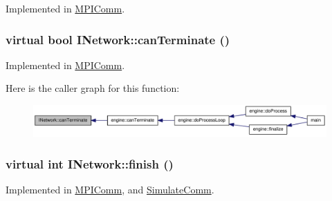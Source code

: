 Implemented in \hyperlink{class_m_p_i_comm_a42d5d0b9d3a804931b2a58c468e08d0d}{MPIComm}.\hypertarget{class_i_network_a49a4daa697317d6fc065897a7926c26c}{
\subsubsection[{canTerminate}]{\setlength{\rightskip}{0pt plus 5cm}virtual bool INetwork::canTerminate ()}}
\label{class_i_network_a49a4daa697317d6fc065897a7926c26c}


Implemented in \hyperlink{class_m_p_i_comm_ae9829165ffcff61c0faea65b30e9a8c1}{MPIComm}.

Here is the caller graph for this function:\nopagebreak
\begin{figure}[H]
\begin{center}
\leavevmode
\includegraphics[width=338pt]{class_i_network_a49a4daa697317d6fc065897a7926c26c_icgraph}
\end{center}
\end{figure}
\hypertarget{class_i_network_a667e56ba7f3713c949f84573ae710a85}{
\subsubsection[{finish}]{\setlength{\rightskip}{0pt plus 5cm}virtual int INetwork::finish ()}}
\label{class_i_network_a667e56ba7f3713c949f84573ae710a85}


Implemented in \hyperlink{class_m_p_i_comm_a96c71e22fbaac04771dffb5791e06692}{MPIComm}, and \hyperlink{class_simulate_comm_aab86214be629c432b2fd0922afa6ba6c}{SimulateComm}.

